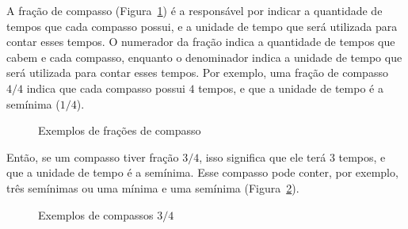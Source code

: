 \documentclass[
  letterpaper,
  DIV=11,
  numbers=noendperiod]{scrreprt}
\begin{document}
A fração de compasso (Figura~\ref{fig-fração}) é a responsável por
indicar a quantidade de tempos que cada compasso possui, e a unidade de
tempo que será utilizada para contar esses tempos. O numerador da fração
indica a quantidade de tempos que cabem e cada compasso, enquanto o
denominador indica a unidade de tempo que será utilizada para contar
esses tempos. Por exemplo, uma fração de compasso \(4/4\) indica que
cada compasso possui \(4\) tempos, e que a unidade de tempo é a semínima
(\(1/4\)).

\begin{figure}


\caption{\label{fig-fração}Exemplos de frações de compasso}

\end{figure}%

Então, se um compasso tiver fração \(3/4\), isso significa que ele terá
3 tempos, e que a unidade de tempo é a semínima. Esse compasso pode
conter, por exemplo, três semínimas ou uma mínima e uma semínima
(Figura~\ref{fig-fração-2}).

\begin{figure}


\caption{\label{fig-fração-2}Exemplos de compassos \(3/4\)}

\end{figure}%
\end{document}
